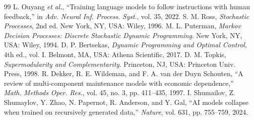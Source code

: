 \documentclass[journal]{IEEEtran}
\begin{document}
\begin{thebibliography}{99}
 L. Ouyang \emph{et al.}, ``Training language models to follow instructions with human feedback,'' in \emph{Adv. Neural Inf. Process. Syst.}, vol. 35, 2022.
 S. M. Ross, \emph{Stochastic Processes}, 2nd ed. New York, NY, USA: Wiley, 1996.
 M. L. Puterman, \emph{Markov Decision Processes: Discrete Stochastic Dynamic Programming}. New York, NY, USA: Wiley, 1994.
 D. P. Bertsekas, \emph{Dynamic Programming and Optimal Control}, 4th ed., vol. I. Belmont, MA, USA: Athena Scientific, 2017.
 D. M. Topkis, \emph{Supermodularity and Complementarity}. Princeton, NJ, USA: Princeton Univ. Press, 1998.
 R. Dekker, R. E. Wildeman, and F. A. van der Duyn Schouten, ``A review of multi-component maintenance models with economic dependence,'' \emph{Math. Methods Oper. Res.}, vol. 45, no. 3, pp. 411--435, 1997.
 I. Shumailov, Z. Shumaylov, Y. Zhao, N. Papernot, R. Anderson, and Y. Gal, ``AI models collapse when trained on recursively generated data,'' \emph{Nature}, vol. 631, pp. 755--759, 2024.
\end{thebibliography}

\end{document}
